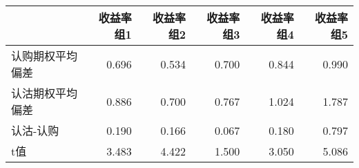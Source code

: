 
\begin{tabular}{lrrrrr}
\toprule
{} &  收益率组1 &  收益率组2 &  收益率组3 &  收益率组4 &  收益率组5 \\
\midrule
认购期权平均偏差 &  0.696 &  0.534 &  0.700 &  0.844 &  0.990 \\
认沽期权平均偏差 &  0.886 &  0.700 &  0.767 &  1.024 &  1.787 \\
认沽-认购    &  0.190 &  0.166 &  0.067 &  0.180 &  0.797 \\
t值       &  3.483 &  4.422 &  1.500 &  3.050 &  5.086 \\
\bottomrule
\end{tabular}
